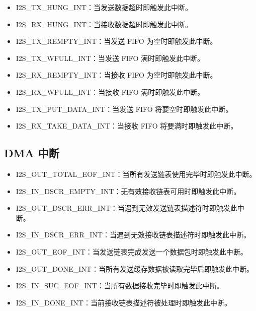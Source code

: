 \documentclass[main\_\_CN.tex]{subfiles}
\begin{document}
\begin{itemize}
\item \label{int:I2STXHUNGINT}I2S\_TX\_HUNG\_INT：当发送数据超时即触发此中断。
\item \label{int:I2SRXHUNGINT}I2S\_RX\_HUNG\_INT：当接收数据超时即触发此中断。
\item \label{int:I2STXREMPTYINT}I2S\_TX\_REMPTY\_INT：当发送 FIFO 为空时即触发此中断。
\item \label{int:I2STXWFULLINT}I2S\_TX\_WFULL\_INT：当发送 FIFO 满时即触发此中断。
\item \label{int:I2SRXREMPTYINT}I2S\_RX\_REMPTY\_INT：当接收 FIFO 为空时即触发此中断。
\item \label{int:I2SRXWFULLINT}I2S\_RX\_WFULL\_INT：当接收 FIFO 满时即触发此中断。
\item \label{int:I2STXPUTDATAINT}I2S\_TX\_PUT\_DATA\_INT：当发送 FIFO 将要空时即触发此中断。
\item \label{int:I2SRXTAKEDATAINT}I2S\_RX\_TAKE\_DATA\_INT：当接收 FIFO 将要满时即触发此中断。
\end{itemize}

\subsection{DMA 中断}\label{DMA Interrupts}
\begin{itemize}
\item \label{int:I2SOUTTOTALEOFINT}I2S\_OUT\_TOTAL\_EOF\_INT：当所有发送链表使用完毕时即触发此中断。
\item \label{int:I2SINDSCREMPTYINT}I2S\_IN\_DSCR\_EMPTY\_INT：无有效接收链表可用时即触发此中断。
\item \label{int:I2SOUTDSCRERRINT}I2S\_OUT\_DSCR\_ERR\_INT：当遇到无效发送链表描述符时即触发此中断。
\item \label{int:I2SINDSCRERRINT}I2S\_IN\_DSCR\_ERR\_INT：当遇到无效接收链表描述符时即触发此中断。
\item \label{int:I2SOUTEOFINT}I2S\_OUT\_EOF\_INT：当发送链表完成发送一个数据包时即触发此中断。
\item \label{int:I2SOUTDONEINT}I2S\_OUT\_DONE\_INT：当所有发送缓存数据被读取完毕后即触发此中断。
\item \label{int:I2SINSUCEOFINT}I2S\_IN\_SUC\_EOF\_INT：当所有数据接收完毕时即触发此中断。
\item \label{int:I2SINDONEINT}I2S\_IN\_DONE\_INT：当前接收链表描述符被处理时即触发此中断。
\end{itemize}
\end{document}
